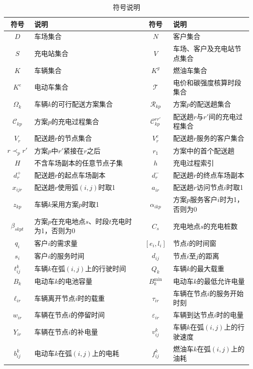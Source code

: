\begin{table}[H]
\centering
\caption{符号说明}
\label{tab:unified-symbols}
\setpsymtabsetup
\begin{tabularx}{\linewidth}{@{}c>{\RaggedRight\arraybackslash}Xc>{\RaggedRight\arraybackslash}X@{}}
\toprule
符号 & 说明 & 符号 & 说明\\
\midrule
$D$ & 车场集合 & $N$ & 客户集合\\
$S$ & 充电站集合 & $V$ & 车场、客户及充电站节点集合\\
$K$ & 车辆集合 & $K^{g}$ & 燃油车集合\\
$K^{e}$ & 电动车集合 & $\mathcal T$ & 电价和碳强度核算时段集合\\
$\Omega_k$ & 车辆$k$的可行配送方案集合 & $\mathcal R_{kp}$ & 方案$p$的配送趟集合\\
$\mathcal C_{kp}$ & 方案$p$的充电过程集合 & $\mathcal C_{kp}^{rr'}$ & 配送趟$r$与$r'$间的充电过程集合\\
$V_r$ & 配送趟$r$的节点集合 & $V_r^{c}$ & 配送趟$r$服务的客户集合\\
$r\prec_p r'$ & 方案$p$中$r'$紧接在$r$之后 & $r_1$ & 方案中的首个配送趟\\
$H$ & 不含车场副本的任意节点子集 & $h$ & 充电过程索引\\
$d_r^{+}$ & 配送趟$r$的起点车场副本 & $d_r^{-}$ & 配送趟$r$的终点车场副本\\
$x_{ijr}$ & 配送趟$r$使用弧$(i,j)$时取1 & $a_{ir}$ & 配送趟$r$访问节点$i$时取1\\
$z_{kp}$ & 车辆$k$采用方案$p$时取1 & $\alpha_{ikp}$ & 方案$p$服务客户$i$时为1，否则为0\\
$\beta_{skpt}$ & 方案$p$在充电地点$s$、时段$t$充电时为1，否则为0 & $C_s$ & 充电地点$s$的充电桩数\\
$q_i$ & 客户$i$的需求量 & $[e_i,l_i]$ & 节点$i$的时间窗\\
$s_i$ & 客户$i$的服务时间 & $d_{ij}$ & 节点$i$至$j$的距离\\
$t_{ij}^{k}$ & 车辆$k$在弧$(i,j)$上的行驶时间 & $Q_k$ & 车辆$k$的最大载重\\
$B_k$ & 电动车$k$的电池容量 & $B_k^{\min}$ & 电动车$k$的最低允许电量\\
$\ell_{ir}$ & 车辆离开节点$i$时的载重 & $\tau_{ir}$ & 车辆在节点$i$的服务开始时刻\\
$w_{ir}$ & 车辆在节点$i$的停留时间 & $\varepsilon_{ir}$ & 车辆到达节点$i$时的电量\\
$Y_{ir}$ & 车辆在节点$i$的补电量 & $v_{ij}^{k}$ & 车辆$k$在弧$(i,j)$上的行驶速度\\
$b_{ij}^{k}$ & 电动车$k$在弧$(i,j)$上的电耗 & $f_{ij}^{k}$ & 燃油车$k$在弧$(i,j)$上的油耗\\

\end{tabularx}
\end{table}
